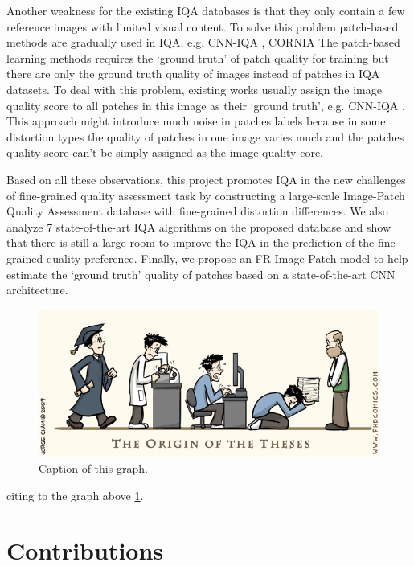 Another weakness for the existing IQA databases is that
they only contain a few reference images with limited visual content. 
To solve this problem patch-based methods are gradually used in IQA, e.g. CNN-IQA \cite{Kang2014}, CORNIA \cite{Ye2012}
The patch-based learning methods requires the \enquote*{ground truth} of patch quality for training
but there are only the ground truth quality of images instead
of patches in IQA datasets.
To deal with this problem, existing works usually assign the image quality score to all patches
in this image as their \enquote*{ground truth}, e.g. CNN-IQA \cite{Kang2014}. 
This approach might introduce much noise in patches labels because in some distortion types the quality of patches in one
image varies much and the patches quality score can’t be
simply assigned as the image quality core. 

Based on all these observations, this project promotes IQA in the new challenges of fine-grained quality assessment task by constructing a large-scale Image-Patch Quality Assessment database with fine-grained distortion differences. 
We also analyze 7 state-of-the-art IQA algorithms on the proposed database and show that there is still a large room to improve the IQA in the prediction of the fine-grained quality preference. 
Finally, we propose an FR Image-Patch model to help estimate the \enquote*{ground truth} quality of patches based on a state-of-the-art CNN architecture.   
   
\begin{figure}[H]
  \includegraphics[width=\linewidth]{charts/writing-thesis.png}
  \caption{Caption of this graph.}
  \label{fig:writing-thesis}
\end{figure}

citing to the graph above \ref{fig:writing-thesis}.

\section{Contributions}

